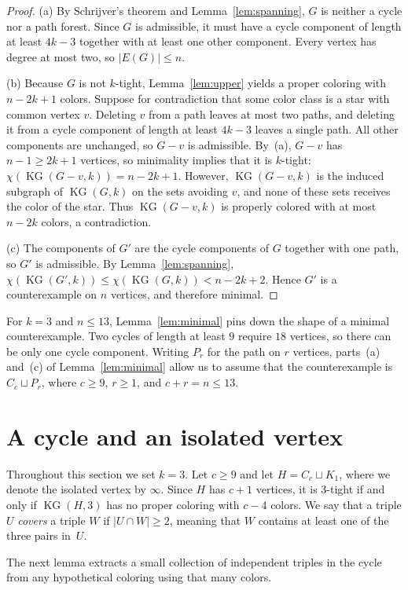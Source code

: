 \documentclass[11pt]{amsart}
\theoremstyle{definition}
\theoremstyle{remark}
\numberwithin{equation}{section}
\newcommand{\KG}{\operatorname{KG}}
\begin{document}
\begin{proof}
(a) By Schrijver's theorem and Lemma~\ref{lem:spanning}, $G$ is neither a
cycle nor a path forest. Since $G$ is admissible, it must have a cycle
component of length at least $4k-3$ together with at least one other component.
Every vertex has degree at most two, so $|E(G)|\le n$.

(b) Because $G$ is not $k$-tight, Lemma~\ref{lem:upper} yields a proper
coloring with $n-2k+1$ colors. Suppose for contradiction that some color class
is a star with common vertex $v$. Deleting $v$ from a path leaves at most two
paths, and deleting it from a cycle component of length at least $4k-3$ leaves
a single path. All other components are unchanged, so $G-v$ is admissible.
By~(a), $G-v$ has $n-1\ge2k+1$ vertices, so minimality implies that it is
$k$-tight: $\chi(\KG(G-v,k))=n-2k+1$. However, $\KG(G-v,k)$ is the induced
subgraph of $\KG(G,k)$ on the sets avoiding $v$, and none of these sets
receives the color of the star. Thus $\KG(G-v,k)$ is properly colored with at
most $n-2k$ colors, a contradiction.

(c) The components of $G'$ are the cycle components of $G$ together with one
path, so $G'$ is admissible. By Lemma~\ref{lem:spanning},
$\chi(\KG(G',k))\le\chi(\KG(G,k))<n-2k+2$. Hence $G'$ is a counterexample on
$n$ vertices, and therefore minimal.
\end{proof}

For $k=3$ and $n\le13$, Lemma~\ref{lem:minimal} pins down the shape of a
minimal counterexample. Two cycles of length at least $9$ require $18$
vertices, so there can be only one cycle component. Writing $P_r$ for the path
on $r$ vertices, parts~(a) and~(c) of Lemma~\ref{lem:minimal} allow us to
assume that the counterexample is $C_c\sqcup P_r$, where $c\ge9$, $r\ge1$, and
$c+r=n\le13$.

\section{A cycle and an isolated vertex}\label{sec:isolate}

Throughout this section we set $k=3$. Let $c\ge9$ and let $H=C_c\sqcup K_1$,
where we denote the isolated vertex by $\infty$. Since $H$ has $c+1$ vertices,
it is $3$-tight if and only if $\KG(H,3)$ has no proper coloring with $c-4$
colors. We say that a triple $U$ \emph{covers} a triple $W$ if
$|U\cap W|\ge2$, meaning that $W$ contains at least one of the three pairs
in~$U$.

The next lemma extracts a small collection of independent triples in the cycle
from any hypothetical coloring using that many colors.
\end{document}
